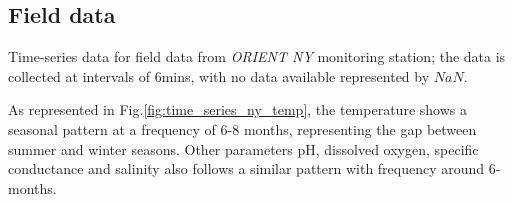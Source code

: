 \subsection{Field data}
Time-series data for field data from \textit{ORIENT NY} monitoring station; the data is collected at intervals of 6mins, with no data available represented by $NaN$.

As represented in Fig.\ref{fig:time_series_ny_temp}, the temperature shows a seasonal pattern at a frequency of 6-8 months, representing the gap between summer and winter seasons. Other parameters pH, dissolved oxygen, specific conductance and salinity also
follows a similar pattern with frequency around 6-months.


\begin{figure}[H]
    \hspace*{4cm} \\

\end{figure}
